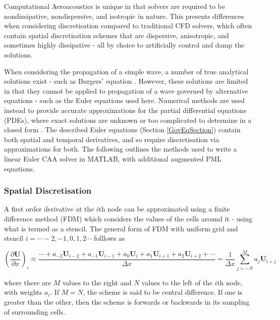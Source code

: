 Computational Aeroacoustics is unique in that solvers are required to be nondissipative, nondispersive, and isotropic in nature. This presents differences when considering discretisation compared to traditional CFD solvers, which often contain spatial discretisation schemes that are dispersive, anisotropic, and sometimes highly dissipative - all by choice to artificially control and damp the solutions.

When considering the propagation of a simple wave, a number of true analytical solutions exist - such as Burgers' equation \cite{landajuela2011burgers}. However, these solutions are limited in that they cannot be applied to propagation of a wave governed by alternative equations - such as the Euler equations used here. Numerical methods are used instead to provide accurate approximations for the partial differential equations (PDEs), where exact solutions are unknown or too complicated to determine in a closed form \cite{suli2003numanalys}. The described Euler equations (Section \ref{GovEqSection}) contain both spatial and temporal derivatives, and so require discretisation via approximations for both. The following outlines the methods used to write a linear Euler CAA solver in MATLAB, with additional augmented PML equations.

\subsubsection{Spatial Discretisation}

A first order derivative at the $i$th node can be approximated using a finite difference method (FDM) which considers the values of the cells around it - using what is termed as a stencil. The general form of FDM with uniform grid and stencil $i = \cdots -2, -1, 0, 1, 2 \cdots$ folllows as


\begin{equation}\label{FDMEquation}
    \left( \frac{\partial \mathbf{U}}{\partial x} \right)_{i} \approx
    \frac{\cdots + a_{-2} \mathbf{U}_{i-2} + a_{-1} \mathbf{U}_{i-1} + a_0 \mathbf{U}_{i} + a_1 \mathbf{U}_{i+1} + a_2 \mathbf{U}_{i+2} + \cdots}{\Delta x}
    = \frac{1}{\Delta x} \sum^M_{j=-N} a_j \mathbf{U}_{i+j}
\end{equation}



where there are $M$ values to the right and $N$ values to the left of the $i$th node, with weights $a_i$. If $M=N$, the scheme is said to be central difference. If one is greater than the other, then the scheme is forwards or backwards in its sampling of surrounding cells.


